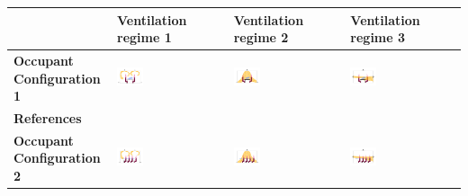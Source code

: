 \documentclass[a4paper,12pt]{elsarticle}
\begin{document}
\begin{table}[ht]
    \centering
    \begin{tabular}{|m{2.5cm}|m{4cm}|m{4cm}|m{4cm}|}
    \hline
     & \textbf{Ventilation regime 1} & \textbf{Ventilation regime 2} & \textbf{Ventilation regime 3} \\
    \hline
    \textbf{Occupant Configuration 1} & \includegraphics[clip,trim={0 2cm 0 2cm},width=0.25\textwidth]{Airflow/mat1.jpeg}& \includegraphics[clip,trim={0 2cm 0 2cm},width=0.25\textwidth]{Airflow/mat4.jpeg}& \includegraphics[clip,trim={0 2cm 0 2cm},width=0.25\textwidth]{Airflow/mat7.jpeg} \\
    \hline
    \textbf{References} & \cite{li2020investigating,zhou2021experimental,pan2022boundary,pan2023predicting,li2022airborne} & \cite{deng2021control,zhou2021experimental,wu2023numerical} & \cite{pendar2020numerical,feng2020influence} \\
    \hline
    \textbf{Occupant Configuration 2} &\includegraphics[clip,trim={0 2cm 0 2cm},width=0.25\textwidth]{Airflow/mat2.jpeg}& \includegraphics[clip,trim={0 2cm 0 2cm},width=0.25\textwidth]{Airflow/mat5.jpeg}& \includegraphics[clip,trim={0 2cm 0 2cm},width=0.25\textwidth]{Airflow/mat8.jpeg} \\

\end{tabular}
\end{table}
\end{document}
